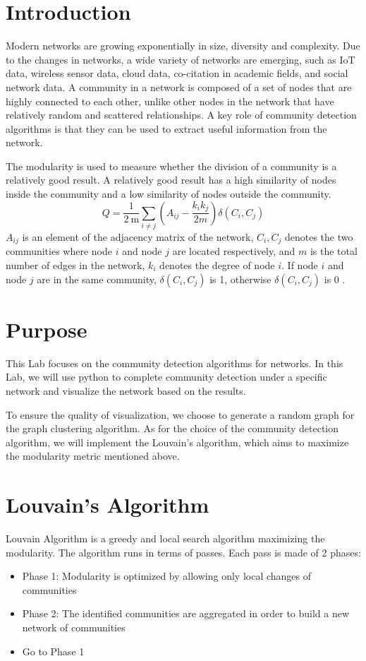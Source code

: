 \section{Introduction}

Modern networks are growing exponentially in size, diversity and complexity. Due to the changes
in networks, a wide variety of networks are emerging, such as IoT data, wireless sensor data, cloud data,
co-citation in academic fields, and social network data. A community in a network is composed of a set of
nodes that are highly connected to each other, unlike other nodes in the network that have relatively random
and scattered relationships. A key role of community detection algorithms is that they can be used to extract
useful information from the network.

The modularity is used to measure whether the division of a community is a relatively good result. A
relatively good result has a high similarity of nodes inside the community and a low similarity of nodes
outside the community.
$$
Q=\frac{1}{2 \mathrm{~m}} \sum_{i \neq j}\left(A_{i j}-\frac{k_{i} k_{j}}{2 m}\right) \delta\left(C_{i}, C_{j}\right)
$$
$A_{i j}$ is an element of the adjacency matrix of the network, $C_{i}, C_{j}$ denotes the two communities where
node $i$ and node $j$ are located respectively, and $m$ is the total number of edges in the network, $k_{i}$ denotes the
degree of node $i$. If node $i$ and node $j$ are in the same community, $\delta\left(C_{i}, C_{j}\right)$ is 1, otherwise $\delta\left(C_{i}, C_{j}\right)$ is 0 .


\section{Purpose}

This Lab focuses on the community detection algorithms for networks. In this Lab, we will use python to complete community detection under a specific network and visualize the network based on the results.

To ensure the quality of visualization, we choose to generate a random graph for the graph clustering algorithm. As for the choice of the community detection algorithm, we will implement the Louvain's algorithm, which aims to maximize the modularity metric mentioned above.

\section{Louvain's Algorithm}
\label{sec:louvain}
Louvain Algorithm is a greedy and local search algorithm maximizing the modularity. The algorithm runs in terms of passes. Each pass is made of 2 phases:
\begin{itemize}
    \item Phase 1: Modularity is optimized by allowing only local changes of communities
    \item Phase 2: The identified communities are aggregated in order to build a new network of communities
    \item Go to Phase 1
\end{itemize}

